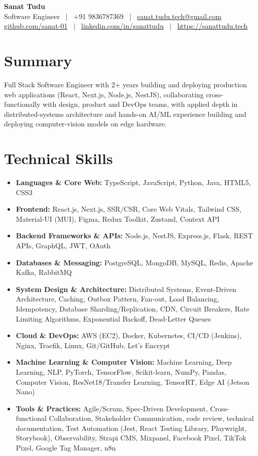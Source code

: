 \documentclass[a4paper,10pt]{article}
\newcommand{\resumeSkill}[2]{
  \item\small{\textbf{#1:} #2}
}
\newcommand{\resumeHeadingListStart}{\begin{itemize}[leftmargin=0.15in, label={}, topsep=0pt, itemsep=0pt, parsep=0pt]}
\newcommand{\resumeHeadingListEnd}{\end{itemize}}
\begin{document}
\begin{center}
  {\Huge \textbf{Sanat Tudu}} \\[3pt]
  \small Software Engineer \ $|$ \ +91 9836787369 \ $|$ \ \href{mailto:sanat.tudu.tech@gmail.com}{sanat.tudu.tech@gmail.com} \\[1pt]
  \small \href{https://github.com/sanat-01}{github.com/sanat-01} \ $|$ \ \href{https://www.linkedin.com/in/sanattudu/}{linkedin.com/in/sanattudu} \ $|$ \ \href{https://sanattudu.tech}{https://sanattudu.tech}
\end{center}
\vspace{-8pt}

\section{Summary}
\small{
   Full Stack Software Engineer with 2+ years building and deploying production web applications (React, Next.js, Node.js, NestJS), collaborating cross-functionally with design, product and DevOps teams, with applied depth in distributed-systems architecture and hands-on AI/ML experience building and deploying computer-vision models on edge hardware.
}

\section{Technical Skills}
  \resumeHeadingListStart{}
    \resumeSkill{Languages \& Core Web}{TypeScript, JavaScript, Python, Java, HTML5, CSS3}
    \resumeSkill{Frontend}{React.js, Next.js, SSR/CSR, Core Web Vitals, Tailwind CSS, Material-UI (MUI), Figma, Redux Toolkit, Zustand, Context API}
    \resumeSkill{Backend Frameworks \& APIs}{Node.js, NestJS, Express.js, Flask, REST APIs, GraphQL, JWT, OAuth}
    \resumeSkill{Databases \& Messaging}{PostgreSQL, MongoDB, MySQL, Redis, Apache Kafka, RabbitMQ}
    \resumeSkill{System Design \& Architecture}{Distributed Systems, Event-Driven Architecture, Caching, Outbox Pattern, Fan-out, Load Balancing, Idempotency, Database Sharding/Replication, CDN, Circuit Breakers, Rate Limiting Algorithms, Exponential Backoff, Dead-Letter Queues}
    \resumeSkill{Cloud \& DevOps}{AWS (EC2), Docker, Kubernetes, CI/CD (Jenkins), Nginx, Traefik, Linux, Git/GitHub, Let's Encrypt}
    \resumeSkill{Machine Learning \& Computer Vision}{Machine Learning, Deep Learning, NLP, PyTorch, TensorFlow, Scikit-learn, NumPy, Pandas, Computer Vision, ResNet18/Transfer Learning, TensorRT, Edge AI (Jetson Nano)}
    \resumeSkill{Tools \& Practices}{Agile/Scrum, Spec-Driven Development, Cross-functional Collaboration, Stakeholder Communication, code review, technical documentation, Test Automation (Jest, React Testing Library, Playwright, Storybook), Observability, Strapi CMS, Mixpanel, Facebook Pixel, TikTok Pixel, Google Tag Manager, n8n}
  \resumeHeadingListEnd{}
\end{document}
